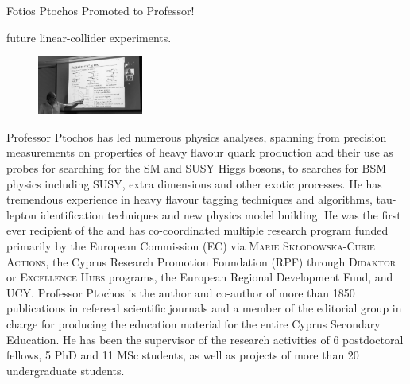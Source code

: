 \begin{headline}[enhanced, tikz={rotate=0}, width=0.6\textwidth]{Fotios Ptochos Promoted to Professor!}
\begin{multicols}{3}
    future linear-collider experiments. 
    \begin{figure}
      \begin{center}
      \leavevmode
      \includegraphics[width=0.31\textwidth]{./figures/Fotis7.png}
      \end{center}
    \end{figure}
    Professor Ptochos has led numerous physics analyses, spanning
    from precision measurements on properties of heavy flavour quark
    production and their use as probes for searching for the SM and SUSY
    Higgs bosons, to searches for BSM physics including SUSY, extra
    dimensions and other exotic processes. He has tremendous experience in
    heavy flavour tagging techniques and algorithms, tau-lepton
    identification techniques and new physics model building. 
    He was the first ever recipient of the  and has co-coordinated multiple research program
    funded primarily by the European Commission (EC) via \textsc{Marie
    Skłodowska-Curie Actions},  the Cyprus Research Promotion
    Foundation (RPF) through \textsc{Didaktor} or \textsc{Excellence
      Hubs} programs, the European Regional Development Fund, and
    UCY. Professor Ptochos is the author and co-author of more than 
    1850 publications in refereed scientific journals and a member of the
    editorial group in charge for producing the education material
    for the entire Cyprus Secondary Education. He has been the
    supervisor of the research activities of 6 postdoctoral fellows, 5
    PhD and 11 MSc students, as well as projects of more than 20
    undergraduate students.  
\end{multicols}
\end{headline}

